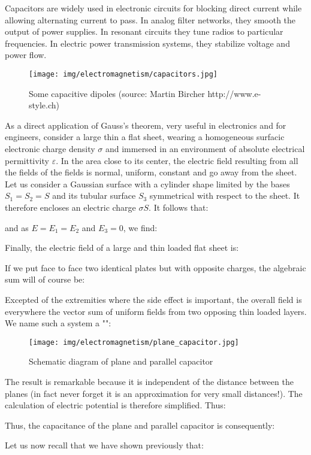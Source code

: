 	Capacitors are widely used in electronic circuits for blocking direct current while allowing alternating current to pass. In analog filter networks, they smooth the output of power supplies. In resonant circuits they tune radios to particular frequencies. In electric power transmission systems, they stabilize voltage and power flow.
	\begin{figure}[H]
		\centering
		\texttt{[image: img/electromagnetism/capacitors.jpg]}
		\caption[Some capacitive dipoles]{Some capacitive dipoles (source: Martin Bircher http://www.e-style.ch)}
	\end{figure}
	As a direct application of Gauss's theorem, very useful in electronics and for engineers, consider a large thin a flat sheet, wearing a homogeneous surfacic electronic charge density $\sigma$ and immersed in an environment of absolute electrical permittivity $\varepsilon$. In the area close to its center, the electric field resulting from all the fields of the fields is normal, uniform, constant and go away from the sheet. Let us consider a Gaussian surface with a cylinder shape limited by the bases $S_1=S_2=S$ and its tubular surface $S_3$ symmetrical with respect to the sheet. It therefore encloses an electric charge $\sigma S$. It follows that:
	
	and as $E=E_1=E_2$ and $E_3=0$, we find:
	
		Finally, the electric field of a large and thin loaded flat sheet is:
	
	If we put face to face two identical plates but with opposite charges, the algebraic sum will of course be:
	
	Excepted of the extremities where the side effect is important, the overall field is everywhere the vector sum of uniform fields from two opposing thin loaded layers. We name such a system a "":
	\begin{figure}[H]
		\centering
		\texttt{[image: img/electromagnetism/plane\_capacitor.jpg]}
		\caption{Schematic diagram of plane and parallel capacitor}
	\end{figure}
	The result is remarkable because it is independent of the distance between the planes (in fact never forget it is an approximation for very small distances!). The calculation of electric potential is therefore simplified. Thus:
	
	Thus, the capacitance of the plane and parallel capacitor is consequently:
	
	Let us now recall that we have shown previously that:
	

